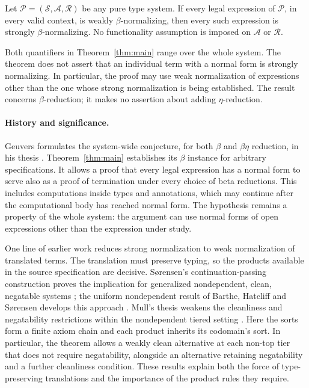\begin{theorem}
\label{thm:main}
Let $\mathcal P=(\mathcal S,\mathcal A,\mathcal R)$ be any pure type system.
If every legal expression of $\mathcal P$, in every valid context, is weakly
$\beta$-normalizing, then every such expression is strongly
$\beta$-normalizing. No functionality assumption is imposed on
$\mathcal A$ or $\mathcal R$.
\end{theorem}

Both quantifiers in Theorem~\ref{thm:main} range over the whole system.
The theorem does not assert that an individual term with a normal form is
strongly normalizing. In particular, the proof may use weak normalization
of expressions other than the one whose strong normalization is being
established. The result concerns $\beta$-reduction; it makes no assertion
about adding $\eta$-reduction.

\paragraph{History and significance.}
Geuvers formulates the system-wide conjecture, for both $\beta$ and
$\beta\eta$ reduction, in his thesis \cite[Conjecture~8.1.2]{Geuvers1993}.
Theorem~\ref{thm:main} establishes its $\beta$ instance for arbitrary
specifications. It allows a proof that every legal expression has a normal
form to serve also as a proof of termination under every choice of beta
reductions. This includes computations inside types and annotations,
which may continue after the computational body has reached normal form.
The hypothesis remains a property of the whole system: the argument can
use normal forms of open expressions other than the expression under study.

One line of earlier work reduces strong normalization to weak
normalization of translated terms. The translation must preserve typing,
so the products available in the source specification are decisive.
S{\o}rensen's continuation-passing construction proves the implication for
generalized nondependent, clean, negatable systems
\cite[Theorem~3.5.20]{Sorensen1997}; the uniform nondependent result of
Barthe, Hatcliff and S{\o}rensen develops this approach
\cite{BartheHatcliffSorensen2001}. Mull's thesis weakens the cleanliness
and negatability restrictions within the nondependent tiered setting
\cite[Theorem~2]{MullThesis2023}. Here the sorts form a finite axiom chain
and each product inherits its codomain's sort. In particular, the theorem
allows a weakly clean alternative at each non-top tier that does not require
negatability, alongside an alternative retaining negatability and a
further cleanliness condition. These results explain both the force of
type-preserving translations and the importance of the product rules they
require.

